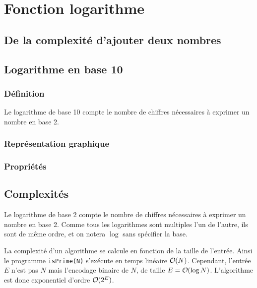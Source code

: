 
\chapter{Fonction logarithme}
\label{chap:log}

\section{De la complexité d'ajouter deux nombres}


\section{Logarithme en base 10}

\subsection{Définition}

Le logarithme de base 10 compte le nombre de chiffres nécessaires à exprimer un nombre en base 2.

\subsection{Représentation graphique}







\subsection{Propriétés}


\section{Complexités}

Le logarithme de base 2 compte le nombre de chiffres nécessaires à exprimer un nombre en base 2.
Comme tous les logarithmes sont multiples l'un de l'autre, ils sont de même ordre, et on notera $\log$ sans spécifier la base.

La complexité d'un algorithme se calcule en fonction de la taille de l'entrée.
Ainsi le programme \texttt{isPrime(N)} s'exécute en temps linéaire $\O(N)$.
Cependant, l'entrée $E$ n'est pas $N$ mais l'encodage binaire de $N$, de taille $E = \O(\log N)$.
L'algorithme est donc exponentiel d'ordre $\O(2^E)$.

